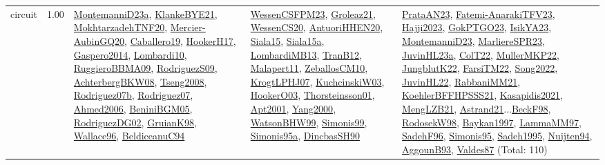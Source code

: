 {\begin{longtable}{p{3cm}r>{\raggedright\arraybackslash}p{6cm}>{\raggedright\arraybackslash}p{6cm}>{\raggedright\arraybackslash}p{8cm}}
\index{circuit}\index{Constraints!circuit}circuit &  1.00 & \hyperref[detail:MontemanniD23a]{MontemanniD23a}, \hyperref[detail:KlankeBYE21]{KlankeBYE21}, \hyperref[detail:MokhtarzadehTNF20]{MokhtarzadehTNF20}, \hyperref[detail:Mercier-AubinGQ20]{Mercier-AubinGQ20}, \hyperref[detail:Caballero19]{Caballero19}, \hyperref[detail:HookerH17]{HookerH17}, \hyperref[detail:Gaspero2014]{Gaspero2014}, \hyperref[detail:Lombardi10]{Lombardi10}, \hyperref[detail:RuggieroBBMA09]{RuggieroBBMA09}, \hyperref[detail:RodriguezS09]{RodriguezS09}, \hyperref[detail:AchterbergBKW08]{AchterbergBKW08}, \hyperref[detail:Tseng2008]{Tseng2008}, \hyperref[detail:Rodriguez07b]{Rodriguez07b}, \hyperref[detail:Rodriguez07]{Rodriguez07}, \hyperref[detail:Ahmed2006]{Ahmed2006}, \hyperref[detail:BeniniBGM05]{BeniniBGM05}, \hyperref[detail:RodriguezDG02]{RodriguezDG02}, \hyperref[detail:GruianK98]{GruianK98}, \hyperref[detail:Wallace96]{Wallace96}, \hyperref[detail:BeldiceanuC94]{BeldiceanuC94} & \hyperref[detail:WessenCSFPM23]{WessenCSFPM23}, \hyperref[detail:Groleaz21]{Groleaz21}, \hyperref[detail:WessenCS20]{WessenCS20}, \hyperref[detail:AntuoriHHEN20]{AntuoriHHEN20}, \hyperref[detail:Siala15]{Siala15}, \hyperref[detail:Siala15a]{Siala15a}, \hyperref[detail:LombardiMB13]{LombardiMB13}, \hyperref[detail:TranB12]{TranB12}, \hyperref[detail:Malapert11]{Malapert11}, \hyperref[detail:ZeballosCM10]{ZeballosCM10}, \hyperref[detail:KrogtLPHJ07]{KrogtLPHJ07}, \hyperref[detail:KuchcinskiW03]{KuchcinskiW03}, \hyperref[detail:HookerO03]{HookerO03}, \hyperref[detail:Thorsteinsson01]{Thorsteinsson01}, \hyperref[detail:Apt2001]{Apt2001}, \hyperref[detail:Yang2000]{Yang2000}, \hyperref[detail:WatsonBHW99]{WatsonBHW99}, \hyperref[detail:Simonis99]{Simonis99}, \hyperref[detail:Simonis95a]{Simonis95a}, \hyperref[detail:DincbasSH90]{DincbasSH90} & \hyperref[detail:PrataAN23]{PrataAN23}, \hyperref[detail:Fatemi-AnarakiTFV23]{Fatemi-AnarakiTFV23}, \hyperref[detail:Hajji2023]{Hajji2023}, \hyperref[detail:GokPTGO23]{GokPTGO23}, \hyperref[detail:IsikYA23]{IsikYA23}, \hyperref[detail:MontemanniD23]{MontemanniD23}, \hyperref[detail:MarliereSPR23]{MarliereSPR23}, \hyperref[detail:JuvinHL23a]{JuvinHL23a}, \hyperref[detail:ColT22]{ColT22}, \hyperref[detail:MullerMKP22]{MullerMKP22}, \hyperref[detail:JungblutK22]{JungblutK22}, \hyperref[detail:FarsiTM22]{FarsiTM22}, \hyperref[detail:Song2022]{Song2022}, \hyperref[detail:JuvinHL22]{JuvinHL22}, \hyperref[detail:RabbaniMM21]{RabbaniMM21}, \hyperref[detail:KoehlerBFFHPSSS21]{KoehlerBFFHPSSS21}, \hyperref[detail:Kasapidis2021]{Kasapidis2021}, \hyperref[detail:MengLZB21]{MengLZB21}, \hyperref[detail:Astrand21]{Astrand21}...\hyperref[detail:BeckF98]{BeckF98}, \hyperref[detail:RodosekW98]{RodosekW98}, \hyperref[detail:Baykan1997]{Baykan1997}, \hyperref[detail:LammaMM97]{LammaMM97}, \hyperref[detail:SadehF96]{SadehF96}, \hyperref[detail:Simonis95]{Simonis95}, \hyperref[detail:Sadeh1995]{Sadeh1995}, \hyperref[detail:Nuijten94]{Nuijten94}, \hyperref[detail:AggounB93]{AggounB93}, \hyperref[detail:Valdes87]{Valdes87} (Total: 110)\\

\end{longtable}}
